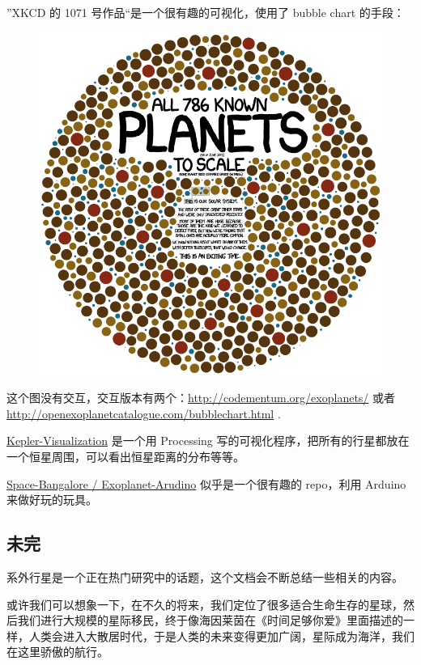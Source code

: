 \documentclass[letterpaper,10pt,english]{sphinxmanual}
\begin{document}
”XKCD 的 1071 号作品“是一个很有趣的可视化，使用了 bubble chart 的手段：
\begin{figure}[htbp]
\centering

\includegraphics{exoplanets.png}
\end{figure}

这个图没有交互，交互版本有两个：\href{http://codementum.org/exoplanets/}{http://codementum.org/exoplanets/} 或者 \href{http://openexoplanetcatalogue.com/bubblechart.html}{http://openexoplanetcatalogue.com/bubblechart.html} .

\href{https://github.com/blprnt/Kepler-Visualization}{Kepler-Visualization} 是一个用 Processing 写的可视化程序，把所有的行星都放在一个恒星周围，可以看出恒星距离的分布等等。

\href{https://github.com/Space-Bangalore/Exoplanet-Arudino}{Space-Bangalore / Exoplanet-Arudino} 似乎是一个很有趣的 repo，利用 Arduino 来做好玩的玩具。


\subsection{未完}
\label{intro:id20}
系外行星是一个正在热门研究中的话题，这个文档会不断总结一些相关的内容。

或许我们可以想象一下，在不久的将来，我们定位了很多适合生命生存的星球，然后我们进行大规模的星际移民，终于像海因莱茵在《时间足够你爱》里面描述的一样，人类会进入大散居时代，于是人类的未来变得更加广阔，星际成为海洋，我们在这里骄傲的航行。
\end{document}
